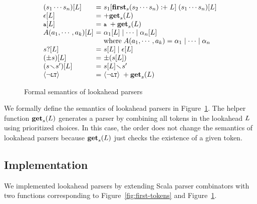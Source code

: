 \begin{figure}[t]
\centering
\small
\[
  \begin{array}{l@{~}c@{~}l}
    (\symb_1 \cdots \symb_n)[\la] &=&
    \symb_1[\symbfirst{\symb_2 \cdots \symb_n} \firstplus \la] \;
    (\symb_1 \cdots \symb_n)[\la]\\
    \epsilon[\la] &=& +\getlap{\la}\\
    \T{a}[\la] &=& \T{a} \; +\getlap{\la} \\
    \NT{A}(\argument_1, \cdots, \argument_k)[\la] &=&
    \rhs_1[\la] \mid \cdots \mid \rhs_n[\la]\\
    && \text{where} \; \NT{A}(\argument_1, \cdots, \argument_k) =
    \rhs_1 \mid \cdots \mid \rhs_n\\

    \symb?[\la] &=& \symb[\la] \mid \epsilon[\la]\\
    (\pm\symb)[\la] &=& \pm(\symb[\la]) \\
    (\symb \butnot \symb')[\la] &=& \symb[\la] \butnot \symb'\\
    \nolt &=& \nolt \; +\getlap{\la}\\
  \end{array}
\]
\vspace*{-1em}
\caption{Formal semantics of lookahead parsers}
\label{fig:laparser}
\vspace*{-1em}
\end{figure}

We formally define the semantics of lookahead parsers in Figure~\ref{fig:laparser}.
The helper function \( \textbf{get}_s(L) \) generates a parser by combining all
tokens in the lookahead \( L \) using prioritized choices.
In this case, the order does not change the semantics of lookahead parsers
because \( \textbf{get}_s(L) \) just checks the existence of a given token.

\subsection{Implementation}\label{sec:convert-bnfes}
We implemented lookahead parsers by extending Scala parser combinators
with two functions corresponding to Figure~\ref{fig:first-tokens} and
Figure~\ref{fig:laparser}.

\smallskip

